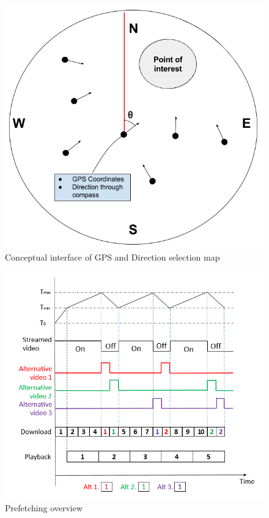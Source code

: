 \begin{figure}[t!]
\begin{center}
	\includegraphics[scale=0.6]{teomet.png}
	\caption{Conceptual interface of GPS and Direction selection map}
	\label{fig:gpsinterface}
\end{center}
\end{figure}

\begin{figure}[t!]
\begin{center}
	\includegraphics[scale=0.6]{prefetch.png}
	\caption{Prefetching overview}
	\label{fig:prefetch}
\end{center}
\end{figure}

